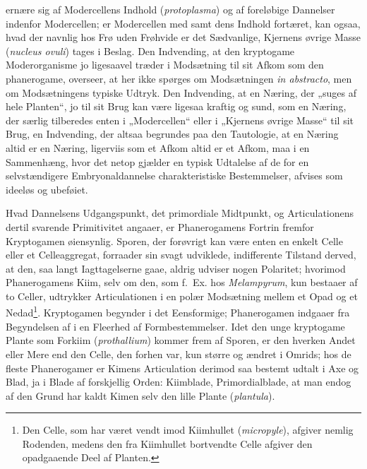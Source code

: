 \documentclass[11pt]{book}
\newcommand{\opage}[1]{\marginnote{\footnotesize\textit{[#1]}}}
\begin{document}
ernære sig af Modercellens Indhold (\textit{protoplasma}) og af foreløbige
Dannelser indenfor Modercellen; er Modercellen med samt dens Indhold
fortæret, kan ogsaa, hvad der navnlig hos Frø uden Frøhvide er det
Sædvanlige, Kjernens øvrige Masse (\textit{nucleus ovuli}) tages i Beslag.
Den Indvending, at den kryptogame Moderorganisme jo ligesaavel træder i
Modsætning til sit Afkom som den phanerogame, overseer, at her ikke spørges
om Modsætningen \textit{in abstracto}, men om Modsætningens typiske Udtryk.
Den Indvending, at en Næring, der „suges af hele Planten“, jo til sit Brug
kan være ligesaa kraftig og sund, som en Næring, der særlig tilberedes enten
i „Modercellen“ eller i „Kjernens øvrige Masse“ til sit Brug, en Indvending,
der altsaa begrundes paa den Tautologie, at en Næring altid er en Næring,
ligerviis som et Afkom altid er et Afkom, maa i en Sammenhæng, hvor det
netop gjælder en typisk Udtalelse af de for en selvstændigere
Embryonaldannelse charakteristiske Bestemmelser, afvises som ideeløs og
ubeføiet.

Hvad Dannelsens Udgangspunkt, det primordiale Midtpunkt, og
Articulationens dertil svarende Primitivitet angaaer, er Phanerogamens
Fortrin fremfor Kryptogamen øiensynlig. Sporen, der forøvrigt kan være
enten en enkelt Celle eller et Celleaggregat, forraader sin svagt udviklede,
indifferente Tilstand derved, at den, saa langt Iagttagelserne gaae, aldrig
udviser nogen Polaritet; hvorimod Phanerogamens Kiim, selv om den, som
f.~Ex. hos \textit{Melampyrum}, kun bestaaer af to Celler, udtrykker
Articulationen i
\opage{301} \setcounter{footnote}{0}%
en polær Modsætning mellem et Opad og et Nedad\footnote{Den Celle, som har
været vendt imod Kiimhullet (\textit{micropyle}), afgiver nemlig Rodenden,
medens den fra Kiimhullet bortvendte Celle afgiver den opadgaaende Deel af
Planten.}. Kryptogamen begynder i det Eensformige; Phanerogamen indgaaer fra
Begyndelsen af i en Fleerhed af Formbestemmelser. Idet den unge kryptogame
Plante som Forkiim (\textit{prothallium}) kommer frem af Sporen, er den
hverken Andet eller Mere end den Celle, den forhen var, kun større og ændret
i Omrids; hos de fleste Phanerogamer er Kimens Articulation derimod saa
bestemt udtalt i Axe og Blad, ja i Blade af forskjellig Orden: Kiimblade,
Primordialblade, at man endog af den Grund har kaldt Kimen selv den lille
Plante (\textit{plantula}).
\end{document}
